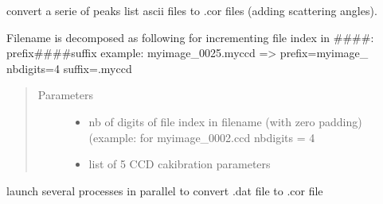 \documentclass[letterpaper,10pt,english]{sphinxmanual}
\begin{document}
\begin{fulllineitems}
\label{\detokenize{Simulation_Module:LaueTools.LaueGeometry.convert2corfile_fileseries}}
convert a serie of peaks list ascii files to .cor files (adding scattering angles).

Filename is decomposed as following for incrementing file index in \#\#\#\#:
prefix\#\#\#\#suffix
example: myimage\_0025.myccd =\textgreater{} prefix=myimage\_ nbdigits=4 suffix=.myccd
\begin{quote}\begin{description}
\item[{Parameters}] \leavevmode\begin{itemize}
\item {} 
 \textendash{} nb of digits of file index in filename (with zero padding)
(example: for myimage\_0002.ccd nbdigits = 4

\item {} 
 \textendash{} list of 5 CCD cakibration parameters

\end{itemize}

\end{description}\end{quote}

\end{fulllineitems}


\begin{fulllineitems}
\label{\detokenize{Simulation_Module:LaueTools.LaueGeometry.convert2corfile_multiprocessing}}
launch several processes in parallel to convert .dat file to .cor file

\end{fulllineitems}
\end{document}
